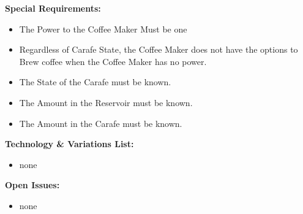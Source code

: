 \documentclass[letterpaper]{article}
\begin{document}
\textbf{Special Requirements:  }
\begin{itemize}
\item The Power to the Coffee Maker Must be one
\item Regardless of Carafe State, the Coffee Maker does not have the
 options to Brew coffee when the Coffee Maker has no power.
\item The State of the Carafe must be known.
\item The Amount in the Reservoir must be known.
\item The Amount in the Carafe must be known.
\end{itemize}
\textbf{Technology \& Variations List:}
\begin{itemize}
\item none
\end{itemize}
\textbf{Open Issues:}
\begin{itemize}
\item none
\end{itemize}
\end{document}
